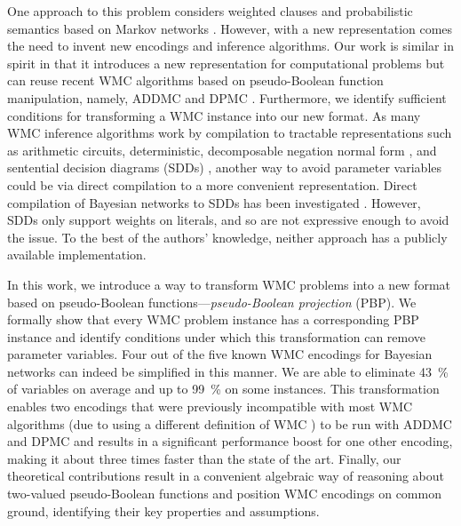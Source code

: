 One approach to this problem considers weighted clauses and probabilistic
semantics based on Markov networks \cite{DBLP:conf/uai/GogateD10}. However, with
a new representation comes the need to invent new encodings and inference
algorithms. Our work is similar in spirit in that it introduces a new
representation for computational problems but can reuse recent WMC algorithms
based on pseudo-Boolean function manipulation, namely, \textsf{ADDMC}
\cite{DBLP:conf/aaai/DudekPV20} and \textsf{DPMC} \cite{DBLP:conf/cp/DudekPV20}.
Furthermore, we identify sufficient conditions for transforming a WMC instance
into our new format. As many WMC inference algorithms
\cite{DBLP:conf/ecai/Darwiche04,DBLP:conf/ijcai/OztokD15} work by compilation to
tractable representations such as arithmetic circuits, deterministic,
decomposable negation normal form \cite{DBLP:journals/jancl/Darwiche01}, and
sentential decision diagrams (SDDs) \cite{DBLP:conf/ijcai/Darwiche11}, another
way to avoid parameter variables could be via direct compilation to a more
convenient representation. Direct compilation of Bayesian networks to SDDs has
been investigated \cite{DBLP:conf/ecsqaru/ChoiKD13}. However, SDDs only support
weights on literals, and so are not expressive enough to avoid the issue. To the
best of the authors' knowledge, neither approach
\cite{DBLP:conf/ecsqaru/ChoiKD13,DBLP:conf/uai/GogateD10} has a publicly
available implementation.

In this work, we introduce a way to transform WMC problems into a new format
based on pseudo-Boolean functions---\emph{pseudo-Boolean projection} (PBP). We
formally show that every WMC problem instance has a corresponding PBP instance
and identify conditions under which this transformation can remove parameter
variables. Four out of the five known WMC encodings for Bayesian networks
\cite{DBLP:conf/ecai/BartKLM16,DBLP:conf/ijcai/ChaviraD05,DBLP:conf/sat/ChaviraD06,DBLP:conf/kr/Darwiche02,DBLP:conf/aaai/SangBK05}
can indeed be simplified in this manner. We are able to eliminate
\SI{43}{\percent} of variables on average and up to \SI{99}{\percent} on some
instances. This transformation enables two encodings that were previously
incompatible with most WMC algorithms (due to using a different definition of
WMC \cite{DBLP:conf/ijcai/ChaviraD05,DBLP:conf/sat/ChaviraD06}) to be run with
\textsf{ADDMC} and \textsf{DPMC} and results in a significant performance boost
for one other encoding, making it about three times faster than the state of the
art. Finally, our theoretical contributions result in a convenient algebraic way
of reasoning about two-valued pseudo-Boolean functions and position WMC
encodings on common ground, identifying their key properties and assumptions.

